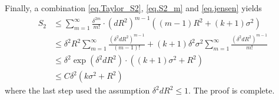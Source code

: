 \documentclass[final,12pt]{colt2018} %
\def \bE {\mathbb{E}}
\def \bR {\mathbb{R}}
\newcommand{\calM}{{\mathcal{M}}}
\begin{document}
Finally, a combination \eqref{eq.Taylor_S2}, \eqref{eq.S2_m} and \eqref{eq.jensen} yields
\begin{align*}
S_2 &\le \sum_{m=1}^\infty \frac{\delta^{2m}}{m!}\cdot (dR^2)^{m-1}\left((m-1)R^2 + (k+1)\sigma^2\right) \\
&\le \delta^2R^2\sum_{m=1}^\infty \frac{(\delta^2dR^2)^{m-1}}{(m-1)!} + (k+1)\delta^2\sigma^2 \sum_{m=1}^\infty \frac{(\delta^2dR^2)^{m-1}}{m!} \\
&\le \delta^2\exp(\delta^2dR^2)\cdot \left((k+1)\sigma^2 + R^2 \right) \\
&\le C\delta^2 \left(k\sigma^2 + R^2\right)
\end{align*}
where the last step used the assumption $\delta^2dR^2\le 1$. The proof is complete. 

%
\end{document}
